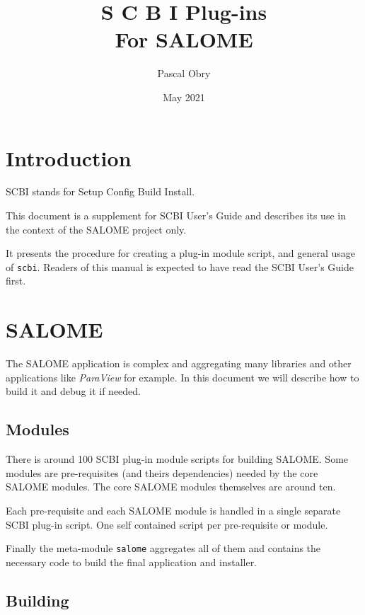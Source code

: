 \documentclass[a4paper,12pt,twoside]{article}
\title{\huge{S C B I \hspace{2mm} Plug-ins} \\ For SALOME}
\author{Pascal Obry}
\date{May 2021}
\newcommand{\code}[1]{\texttt{#1}}
\renewcommand{\emph}[1]{\textit{#1}}
\let\stdsection\section
\renewcommand\section{\newpage\stdsection}
\begin{document}
\maketitle

\tableofcontents


\section{Introduction}

SCBI stands for Setup Config Build Install.

This document is a supplement for SCBI User's Guide and describes its use in the context of the SALOME project only.

It presents the procedure for creating a plug-in module script, and general usage of \code{scbi}. Readers of this manual is expected to have read the SCBI User's Guide first.


\section{SALOME}

The SALOME application is complex and aggregating many libraries and other applications like \emph{ParaView} for example. In this document we will describe how to build it and debug it if needed.

\subsection{Modules}
\label{modules}

There is around 100 SCBI plug-in module scripts for building SALOME. Some modules are pre-requisites (and theirs dependencies) needed by the core SALOME modules. The core SALOME modules themselves are around ten.

Each pre-requisite and each SALOME module is handled in a single separate SCBI plug-in script. One self contained script per pre-requisite or module.

Finally the meta-module \code{salome} aggregates all of them and contains the necessary code to build the final application and installer.

\subsection{Building}
\end{document}
